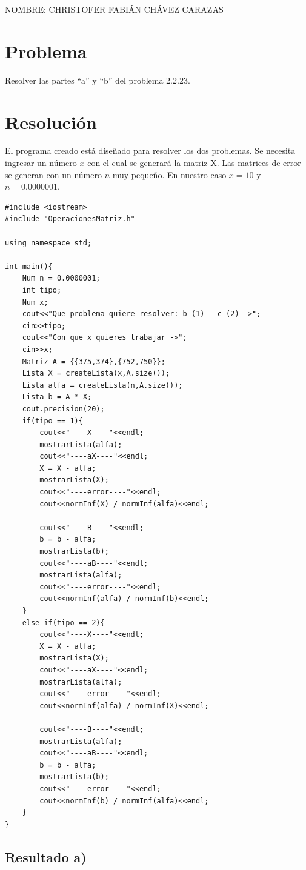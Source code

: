 \documentclass[a4paper,12pt]{article}
\begin{document}
\begin{Large}
 NOMBRE: CHRISTOFER FABIÁN CHÁVEZ CARAZAS
\end{Large}

\section{Problema}

Resolver las partes ``a'' y ``b'' del problema 2.2.23.

\section{Resolución}

El programa creado está diseñado para resolver los dos problemas. Se necesita ingresar un número $x$ con el
cual se generará la matriz X. Las matrices de error se generan con un número $n$ muy pequeño.
En nuestro caso $x=10$ y $n=0.0000001$.

\begin{lstlisting}
#include <iostream>
#include "OperacionesMatriz.h"

using namespace std;

int main(){
	Num n = 0.0000001;
	int tipo;
	Num x;
	cout<<"Que problema quiere resolver: b (1) - c (2) ->";
	cin>>tipo;
	cout<<"Con que x quieres trabajar ->";
	cin>>x;
	Matriz A = {{375,374},{752,750}};
	Lista X = createLista(x,A.size());
	Lista alfa = createLista(n,A.size());
	Lista b = A * X;
	cout.precision(20);
	if(tipo == 1){
		cout<<"----X----"<<endl;
		mostrarLista(alfa);
		cout<<"----aX----"<<endl;
		X = X - alfa;
		mostrarLista(X);
		cout<<"----error----"<<endl;
		cout<<normInf(X) / normInf(alfa)<<endl;

		cout<<"----B----"<<endl;
		b = b - alfa;
		mostrarLista(b);
		cout<<"----aB----"<<endl;
		mostrarLista(alfa);
		cout<<"----error----"<<endl;
		cout<<normInf(alfa) / normInf(b)<<endl;
	}
	else if(tipo == 2){
		cout<<"----X----"<<endl;
		X = X - alfa;
		mostrarLista(X);
		cout<<"----aX----"<<endl;
		mostrarLista(alfa);
		cout<<"----error----"<<endl;
		cout<<normInf(alfa) / normInf(X)<<endl;

		cout<<"----B----"<<endl;
		mostrarLista(alfa);
		cout<<"----aB----"<<endl;
		b = b - alfa;
		mostrarLista(b);
		cout<<"----error----"<<endl;
		cout<<normInf(b) / normInf(alfa)<<endl;	
	}
}
\end{lstlisting}

\subsection{Resultado a)}
\end{document}
